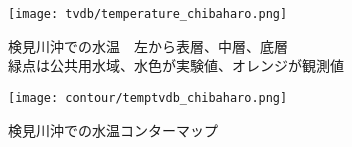 \documentclass[fontsize=12pt,paper=a4]{jlreq}
\begin{document}
\begin{figure}[hbtp]
  \centering
  \texttt{[image: tvdb/temperature\_chibaharo.png]}
  \caption{検見川沖での水温　左から表層、中層、底層\\緑点は公共用水域、水色が実験値、オレンジが観測値}
\end{figure}


\begin{figure}[hbtp]
    \centering
    \texttt{[image: contour/temptvdb\_chibaharo.png]}
    \caption{検見川沖での水温コンターマップ}
\end{figure}


\end{document}
